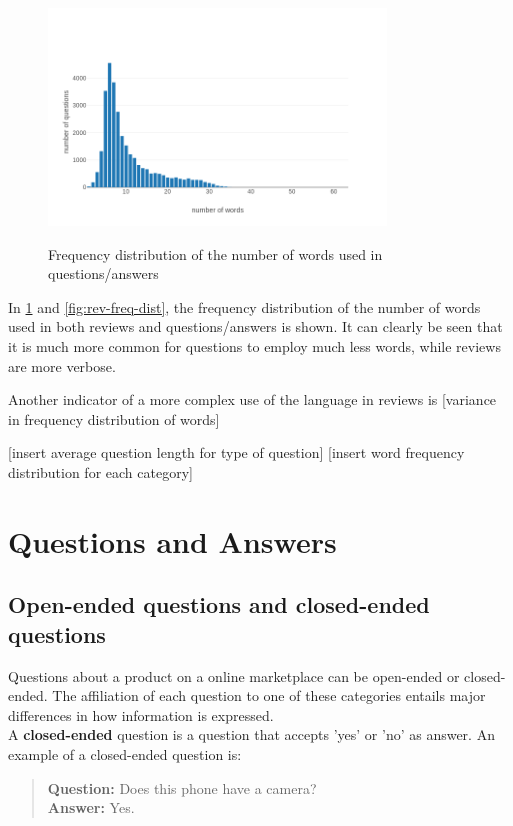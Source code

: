 \documentclass[LaM,binding=0.6cm]{sapthesis}
\begin{document}
\begin{figure}
\centering
\includegraphics[width=0.8\textwidth]{pictures/quest_freq_dist.png}\\[3ex]
\caption{Frequency distribution of the number of words used in questions/answers}
\label{fig:quest-freq-dist}
\end{figure}

In \ref{fig:quest-freq-dist} and \ref{fig:rev-freq-dist}, the frequency distribution of the number of words used in both reviews and questions/answers is shown. It can clearly be seen that it is much more common for questions to employ much less words, while reviews are more verbose.

Another indicator of a more complex use of the language in reviews is [variance in frequency distribution of words]

[insert average question length for type of question]
[insert word frequency distribution for each category]

\section{Questions and Answers}

\subsection{Open-ended questions and closed-ended questions}

Questions about a product on a online marketplace can be open-ended or closed-ended. The affiliation of each question to one of these categories entails major differences in how information is expressed. \\

A \textbf{closed-ended} question is a question that accepts 'yes' or 'no' as answer. An example of a closed-ended question is:
\begin{quote}
\textbf{Question:} Does this phone have a camera? \\
\textbf{Answer:} Yes.
\end{quote} 
\end{document}
